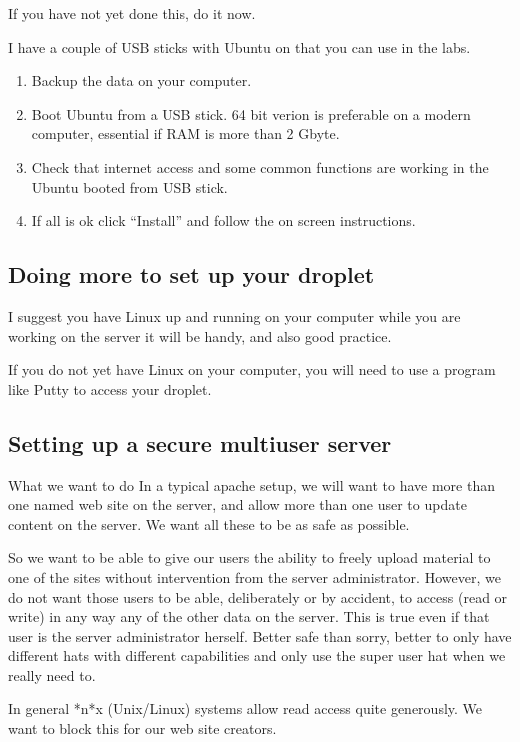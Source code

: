 \documentclass[12pt, a4paper]{article}
\begin{document}
If you have not yet done this, do it now. 

I have a couple of USB sticks with Ubuntu on that you can use in the labs.


\begin{enumerate}
 \item Backup the data on your computer.
 \item Boot Ubuntu from a USB stick. 64 bit verion is preferable on a modern computer, 
  essential if RAM is more than 2 Gbyte.
 \item Check that internet access and some common functions are working in the Ubuntu booted from USB stick.
 \item If all is ok click ``Install'' and follow the on screen instructions.
\end{enumerate}

\subsection*{Doing more to set up your droplet}


I suggest you have Linux up and running on your computer while you are working on the server  it will be handy, and also good practice.

If you do not yet have Linux on your computer, you will need to use a program like Putty to access your droplet.

\subsection*{Setting up a secure  multiuser server}

What we want to do
In a typical apache setup, we will want to have more than one named web site on the server, and allow more than one user to update content on the server. We want all these to be as safe as possible.

So we want to be able to give our users the ability to freely upload material to one of the sites without intervention from the server administrator. However, we do not want those users to be able, deliberately or by accident, to access (read or write) in any way any of the other data on the server. This is true even if that user is the server administrator herself. Better safe than sorry, better to only have different hats with different capabilities and only use the super user hat when we really need to.

In general *n*x (Unix/Linux) systems allow read access quite generously. We want to block this for our web site creators.
\end{document}
